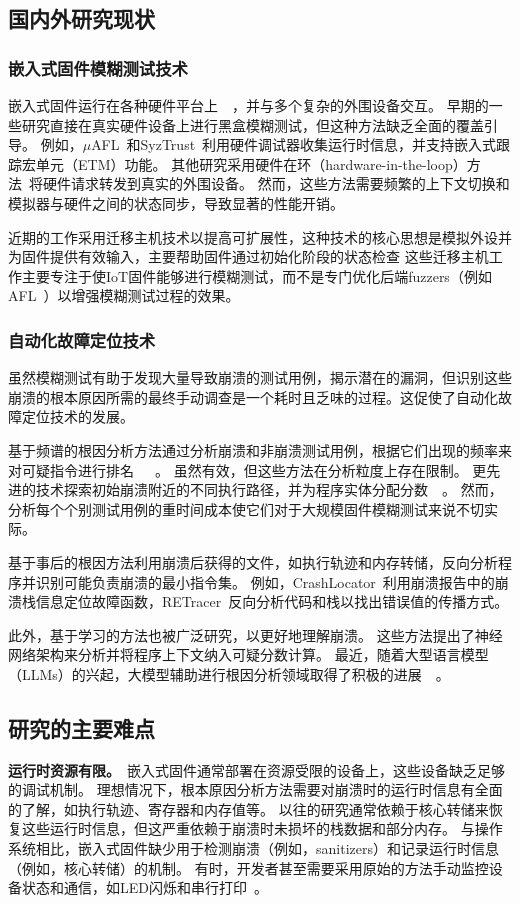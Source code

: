 \subsection{国内外研究现状}
\subsubsection{嵌入式固件模糊测试技术}
嵌入式固件运行在各种硬件平台上~\cite{IoTFuzzer2018}~\cite{SOBER}，并与多个复杂的外围设备交互。
早期的一些研究直接在真实硬件设备上进行黑盒模糊测试，但这种方法缺乏全面的覆盖引导。
例如，$\mu$AFL~\cite{mu2022}和SyzTrust~\cite{SyzTrust2023}利用硬件调试器收集运行时信息，并支持嵌入式跟踪宏单元（ETM\cite{Embedded2011}）功能。
其他研究采用硬件在环（hardware-in-the-loop）方法~\cite{SURROGATES}将硬件请求转发到真实的外围设备。
然而，这些方法需要频繁的上下文切换和模拟器与硬件之间的状态同步，导致显著的性能开销。

近期的工作采用迁移主机技术以提高可扩展性，这种技术的核心思想是模拟外设并为固件提供有效输入，主要帮助固件通过初始化阶段的状态检查
这些迁移主机工作主要专注于使IoT固件能够进行模糊测试，而不是专门优化后端fuzzers（例如AFL~\cite{AFL}）以增强模糊测试过程的效果。
\subsubsection{自动化故障定位技术}
虽然模糊测试有助于发现大量导致崩溃的测试用例，揭示潜在的漏洞，但识别这些崩溃的根本原因所需的最终手动调查是一个耗时且乏味的过程。这促使了自动化故障定位技术的发展。

基于频谱的根因分析方法通过分析崩溃和非崩溃测试用例，根据它们出现的频率来对可疑指令进行排名~\cite{Accuracy}~\cite{Evaluation2006}~\cite{Empirical2005}。
虽然有效，但这些方法在分析粒度上存在限制。
更先进的技术探索初始崩溃附近的不同执行路径，并为程序实体分配分数~\cite{AURORA}~\cite{Statistical2007}。
然而，分析每个个别测试用例的重时间成本使它们对于大规模固件模糊测试来说不切实际。

基于事后的根因方法利用崩溃后获得的文件，如执行轨迹和内存转储，反向分析程序并识别可能负责崩溃的最小指令集。
例如，CrashLocator~\cite{CrashLocator2014}利用崩溃报告中的崩溃栈信息定位故障函数，RETracer~\cite{RETracer2016}反向分析代码和栈以找出错误值的传播方式。

此外，基于学习的方法也被广泛研究，以更好地理解崩溃。
这些方法提出了神经网络架构来分析并将程序上下文纳入可疑分数计算。
最近，随着大型语言模型（LLMs）的兴起，大模型辅助进行根因分析领域取得了积极的进展~\cite{How2024}~\cite{Large2024}。

\subsection{研究的主要难点}
\textbf{运行时资源有限。}\ 嵌入式固件通常部署在资源受限的设备上，这些设备缺乏足够的调试机制。
理想情况下，根本原因分析方法需要对崩溃时的运行时信息有全面的了解，如执行轨迹、寄存器和内存值等。
以往的研究通常依赖于核心转储来恢复这些运行时信息，但这严重依赖于崩溃时未损坏的栈数据和部分内存。
与操作系统相比，嵌入式固件缺少用于检测崩溃（例如，sanitizers）和记录运行时信息（例如，核心转储）的机制。
有时，开发者甚至需要采用原始的方法手动监控设备状态和通信，如LED闪烁和串行打印~\cite{IoT2021}。

